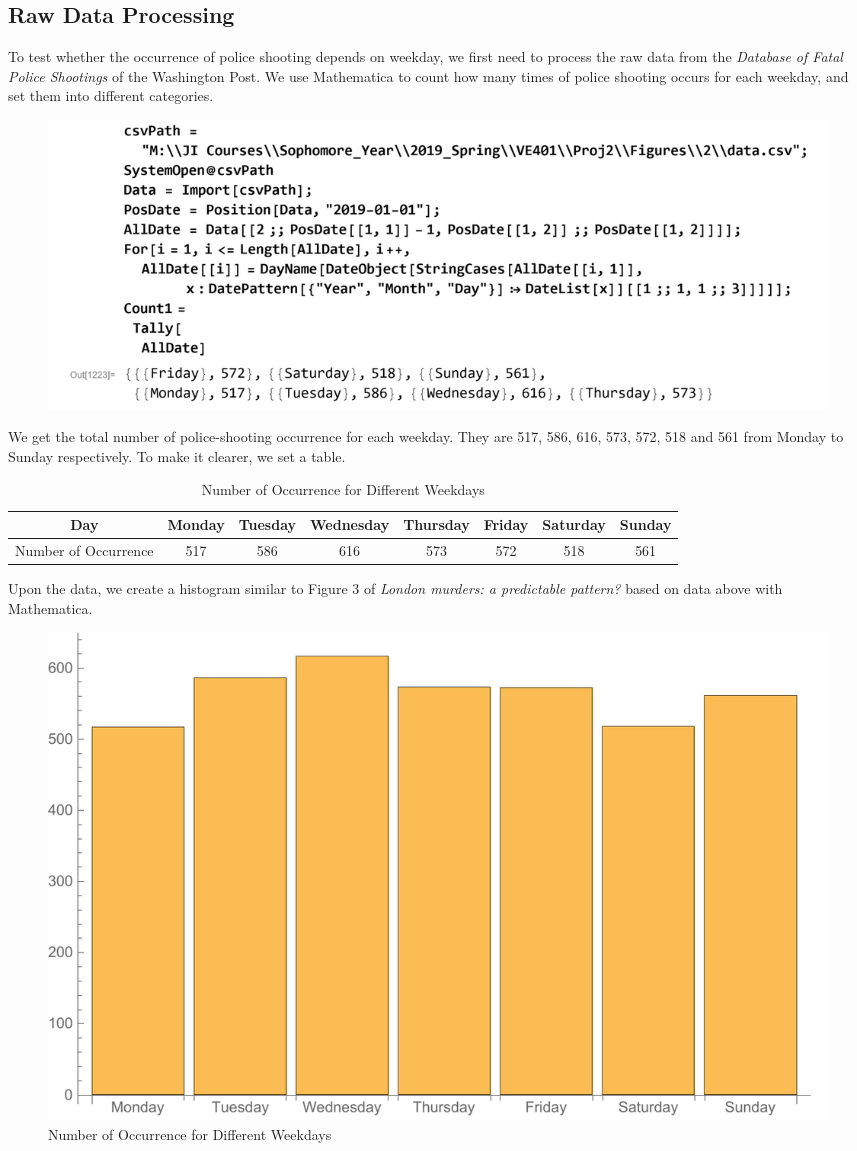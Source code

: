 \documentclass[a4paper]{article}
\begin{document}
\subsection{Raw Data Processing}
To test whether the occurrence of police shooting depends on weekday, we first need to process the raw data from the \emph{Database of Fatal Police Shootings} of the Washington Post. We use Mathematica to count how many times of police shooting occurs for each weekday, and set them into different categories.

\begin{figure}[!htbp]
\centering
\includegraphics[width=1\linewidth]{dataprocess4.jpg}
\end{figure}

We get the total number of police-shooting occurrence for each weekday. They are 517, 586, 616, 573, 572, 518 and 561 from Monday to Sunday respectively. To make it clearer, we set a table.

\begin{table}[!htbp]
\centering
\begin{tabular}{c|ccccccc}
Day        & Monday & Tuesday & Wednesday & Thursday & Friday & Saturday & Sunday \\ \hline
Number of Occurrence & 517    & 586     & 616       & 573      & 572    & 518      & 561    \\
\end{tabular}
\caption{Number of Occurrence for Different Weekdays}
\end{table}

Upon the data, we create a histogram similar to Figure 3 of \textit{London murders: a predictable pattern?} based on data above with Mathematica.

\newpage

\begin{figure}[!htbp]
\centering
\includegraphics[width=0.8\linewidth]{occur.pdf}
\caption{Number of Occurrence for Different Weekdays}
\end{figure}
\end{document}
